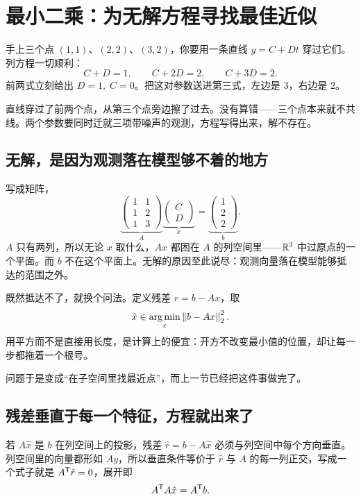 \section{最小二乘：为无解方程寻找最佳近似}
\label{sec:03-Linear-Algebra/03-Orthogonality/03}

手上三个点 \((1,1)\)、\((2,2)\)、\((3,2)\)，你要用一条直线 \(y=C+Dt\) 穿过它们。列方程一切顺利：
\[
C+D=1,\qquad C+2D=2,\qquad C+3D=2 .
\]
前两式立刻给出 \(D=1,\;C=0\)。把这对参数送进第三式，左边是 \(3\)，右边是 \(2\)。

直线穿过了前两个点，从第三个点旁边擦了过去。没有算错——三个点本来就不共线。两个参数要同时迁就三项带噪声的观测，方程写得出来，解不存在。

\subsection{无解，是因为观测落在模型够不着的地方}

写成矩阵，
\[
\underbrace{\begin{pmatrix}1&1\\1&2\\1&3\end{pmatrix}}_{A}
\underbrace{\begin{pmatrix}C\\D\end{pmatrix}}_{x}
=\underbrace{\begin{pmatrix}1\\2\\2\end{pmatrix}}_{b}.
\]
\(A\) 只有两列，所以无论 \(x\) 取什么，\(Ax\) 都困在 \(A\) 的列空间里——\(\mathbb{R}^3\) 中过原点的一个平面。而 \(b\) 不在这个平面上。无解的原因至此说尽：观测向量落在模型能够抵达的范围之外。

既然抵达不了，就换个问法。定义残差 \(r=b-Ax\)，取
\[
\hat x\in\operatorname*{arg\,min}_x\left\lVert b-Ax\right\rVert_2^2 .
\]
用平方而不是直接用长度，是计算上的便宜：开方不改变最小值的位置，却让每一步都拖着一个根号。

问题于是变成``在子空间里找最近点''，而上一节已经把这件事做完了。

\subsection{残差垂直于每一个特征，方程就出来了}

若 \(A\hat x\) 是 \(b\) 在列空间上的投影，残差 \(\hat r=b-A\hat x\) 必须与列空间中每个方向垂直。列空间里的向量都形如 \(Ay\)，所以垂直条件等价于 \(\hat r\) 与 \(A\) 的每一列正交，写成一个式子就是 \(A^{\mathsf{T}}\hat r=0\)，展开即
\[
A^{\mathsf{T}}A\hat x=A^{\mathsf{T}}b .
\]

